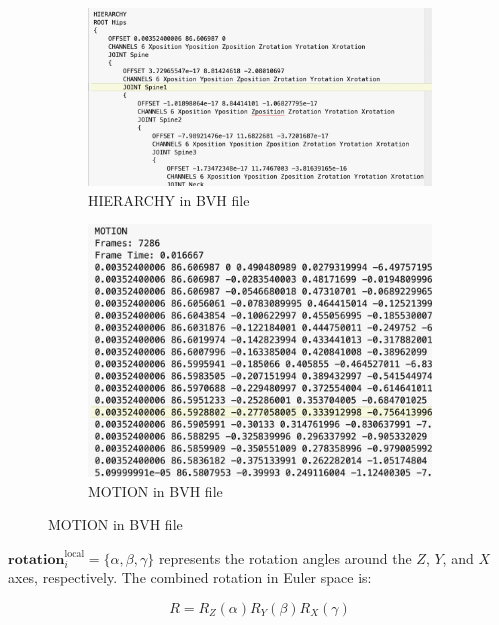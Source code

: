 \begin{figure}[htbp]
	\centering
	\begin{subfigure}{0.49\linewidth}
		\centering
		\includegraphics[width=\linewidth]{images/BVH1}
		\caption{HIERARCHY in BVH file}
		\label{fig:BVH1}
	\end{subfigure}
	\hfill
	\begin{subfigure}{0.49\linewidth}
		\centering
		\includegraphics[width=\linewidth]{images/BVH2}
		\caption{MOTION in BVH file}
		\label{fig:BVH2}
	\end{subfigure}
\end{figure}

$\mathbf{rotation}_i^{\operatorname{local}} = \{ \alpha ,\beta , \gamma \}$ represents the rotation angles around the $Z$, $Y$, and $X$ axes, respectively. The combined rotation in Euler space is:

\begin{equation}
	R = R_Z(\alpha) R_Y(\beta) R_X(\gamma)
\end{equation}

